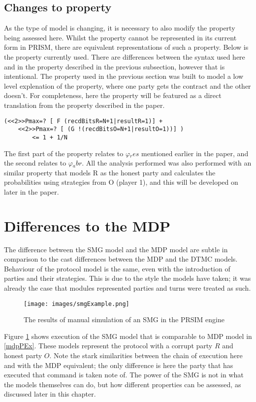 \documentclass{l4proj}
\begin{document}
\subsection{Changes to property}

As the type of model is changing, it is necessary to also modify the property being assessed here. Whilst the property cannot be represented in its current form in PRISM, there are equivalent representations of such a property. Below is the property currently used. There are differences between the syntax used here and in the property described in the previous subsection, however that is intentional. The property used in the previous section was built to model a low level explenation of the property, where one party gets the contract and the other doesn't. For completeness, here the property will be featured as a direct translation from the property described in the paper. 

\begin{lstlisting}
(<<2>>Pmax=? [ F (recdBitsR=N+1|resultR=1)] + 
    <<2>>Pmax=? [ (G !(recdBitsO=N+1|resultO=1))] ) 
        <= 1 + 1/N
\end{lstlisting}

The first part of the property relates to $\varphi{_res}$ mentioned earlier in the paper, and the second relates to $\varphi{_abr}$. All the analysis performed was also performed with an similar property that models R as the honest party and calculates the probabilities using strategies from O (player 1), and this will be developed on later in the paper. 

\section{Differences to the MDP}

The difference between the SMG model and the MDP model are subtle in comparison to the cast differences between the MDP and the DTMC models. Behaviour of the protocol model is the same, even with the introduction of parties and their strategies. This is due to the style the models have taken; it was already the case that modules represented parties and turns were treated as such. 

\begin{figure}[ht!]
\centering
\texttt{[image: images/smgExample.png]}
\caption{The results of manual simulation of an SMG in the PRSIM engine}
\label{smgEx}
\end{figure}

Figure \ref{smgEx} shows execution of the SMG model that is comparable to MDP model in \ref{mdpPEx}. These models represent the protocol with a corrupt party $R$ and honest party $O$. Note the stark similarities between the chain of execution here and with the MDP equivalent; the only difference is here the party that has executed that command is taken note of. The power of the SMG is not in what the models themselves can do, but how different properties can be assessed, as discussed later in this chapter.
\end{document}
